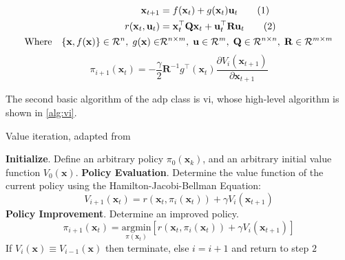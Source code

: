 \documentclass[../report.tex]{subfiles}
\begin{document}
{\myfont
\begin{align*}
    \mathbf{x}_{t+1} & = f(\mathbf{x}_t) + g(\mathbf{x}_t)\mathbf{u}_t \stepcounter{equation}\tag{\theequation}\label{eq:normal_system_dynamics}\\
    r(\mathbf{x}_t, \mathbf{u}_t) &= \mathbf{x}_t^{\top}\mathbf{Q}\mathbf{x}_t + \mathbf{u}_t^{\top}\mathbf{R}\mathbf{u}_t \stepcounter{equation}\tag{\theequation}\label{eq:lqr_cost}\\
    \text{Where} \quad \{\mathbf{x}, f(\mathbf{x})\} \in \mathcal{R}^n, \; g(\mathbf{x}) \in& \mathcal{R}^{n \times m}, \; \mathbf{u} \in \mathcal{R}^m, \; \mathbf{Q} \in \mathcal{R}^{n \times n}, \; \mathbf{R} \in \mathcal{R}^{m \times m}
\end{align*}
}
\begin{equation}\label{eq:optimal_policy_improvement}
    \pi_{i+1}(\mathbf{x}_t) = -\frac{\gamma}{2}\mathbf{R}^{-1}g^{\top}(\mathbf{x}_t)\frac{\partial V_i(\mathbf{x}_{t+1})}{\partial \mathbf{x}_{t+1}}
\end{equation}

The second basic algorithm of the \ac{adp} class is \ac{vi}, whose high-level algorithm is shown in \autoref{alg:vi}.


\begin{algorithm}[H]
	\caption{Value iteration, adapted from \cite{pi_and_vi_algorithm}} \label{alg:vi}
	\begin{algorithmic}[1]
        \State \textbf{Initialize}. Define an arbitrary policy $\pi_0(\mathbf{x}_k)$, and an arbitrary initial value function $V_0(\mathbf{x})$.
        \State \textbf{Policy Evaluation}. Determine the value function of the current policy using the Hamilton-Jacobi-Bellman Equation:
        \begin{equation}\label{eq:adp_poli_eval_vi}
            V_{i+1}(\mathbf{x}_t) = r(\mathbf{x}_t, \pi_i(\mathbf{x}_t)) + \gamma V_i(\mathbf{x}_{t+1})
        \end{equation}
        \State \textbf{Policy Improvement}. Determine an improved policy. 
        {\myfont
        \begin{equation}
            \pi_{i+1}(\mathbf{x}_t) = \underset{\pi(\mathbf{x}_t)}{\text{argmin}}[r(\mathbf{x}_t, \pi_i(\mathbf{x}_t)) + \gamma V_i(\mathbf{x}_{t+1})]
        \end{equation}}
        \State If $V_i(\mathbf{x}) \equiv V_{i-1}(\mathbf{x})$ then terminate, else $i = i+1$ and return to step $2$
	\end{algorithmic} 
\end{algorithm}
\end{document}
